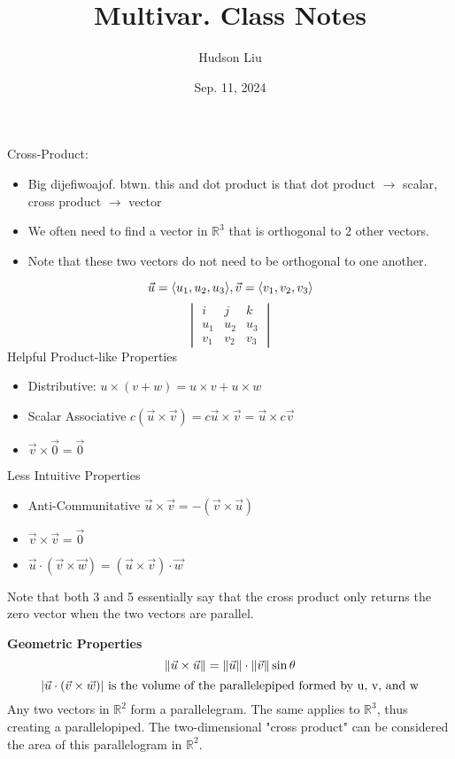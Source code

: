 \documentclass{article}
\title{Multivar. Class Notes}
\author{Hudson Liu}
\date{Sep. 11, 2024}
\DeclarePairedDelimiter{\opair}{\langle}{\rangle}
\newcommand{\R}{\mathbb{R}}
\begin{document}
\maketitle
Cross-Product:
\begin{itemize}
    \item Big dijefiwoajof. btwn. this and dot product is that dot product $\rightarrow$ scalar, cross product $\rightarrow$ vector
    \item We often need to find a vector in $\R^3$ that is orthogonal to 2 other vectors.
    \item Note that these two vectors do not need to be orthogonal to one another.
\end{itemize}
\[
    \vec{u} = \opair{u_1, u_2, u_3}, \vec{v} = \opair{v_1, v_2, v_3}
\]
\[
\begin{vmatrix}
    i & j & k\\
    u_1 & u_2 & u_3\\
    v_1 & v_2 & v_3
\end{vmatrix}
\]
Helpful Product-like Properties
\begin{itemize}
    \item Distributive: $u \times (v + w) = u \times v + u \times w$
    \item Scalar Associative $c(\vec{u} \times \vec{v})= c\vec{u} \times \vec{v} = \vec{u} \times c\vec{v}$
    \item $\vec{v} \times \vec{0} = \vec{0}$
\end{itemize}

Less Intuitive Properties
\begin{itemize}
    \item Anti-Communitative $\vec{u} \times \vec{v} = -(\vec{v} \times \vec{u})$
    \item $\vec{v} \times \vec{v} = \vec{0}$
    \item $\vec{u} \cdot (\vec{v} \times \vec{w}) = (\vec{u} \times \vec{v}) \cdot \vec{w}$
\end{itemize}
Note that both 3 and 5 essentially say that the cross product only returns the zero vector when the two vectors are parallel.\newline

\textbf{Geometric Properties}
\[
    \norm{\vec{u} \times \vec{u}} = \norm{\vec{u}} \cdot \norm{\vec{v}} \sin{\theta}
\]
\[
    \abs{\vec{u} \cdot (\vec{v} \times \vec{w})} \text{ is the volume of the parallelepiped formed by u, v, and w}
\]
Any two vectors in $\R^2$ form a parallelegram. The same applies to $\R^3$, thus creating a parallelopiped. The two-dimensional "cross product" can be considered the area of this parallelogram in $\R^2$.
\end{document}
